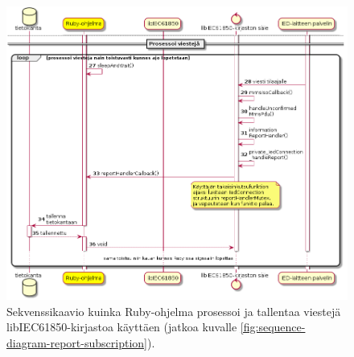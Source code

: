 \begin{figure}
	\includegraphics[width=1\textwidth]{pictures/sequence-diagram-report-subscription_001.png}
	\caption{Sekvenssikaavio kuinka Ruby-ohjelma prosessoi ja tallentaa viestejä libIEC61850-kirjastoa käyttäen (jatkoa kuvalle \ref{fig:sequence-diagram-report-subscription}).}
	\label{fig:sequence-diagram-report-subscription-processing}
\end{figure}

